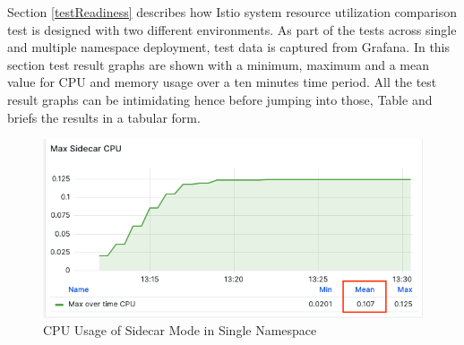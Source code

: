 Section \ref{testReadiness} describes how Istio system resource utilization comparison test is designed with two different environments. As part of the tests across single and multiple namespace deployment, test data is captured from Grafana. In this section test result graphs are shown with a minimum, maximum and a mean value for CPU and memory usage over a ten minutes time period. All the test result graphs can be intimidating hence before jumping into those, Table  and  briefs the results in a tabular form.




\begin{figure}[H]
  \centering
  \includegraphics[width=0.8\linewidth]{resources/max-sidecar-cpu.png}
  \caption{CPU Usage of Sidecar Mode in Single Namespace}
\end{figure}

